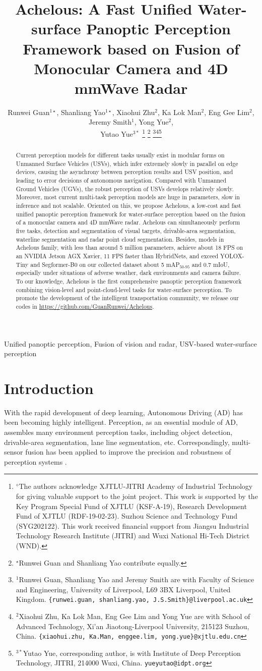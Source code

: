 \documentclass[letterpaper, 10 pt, conference]{ieeeconf}
\title{Achelous: A Fast Unified Water-surface Panoptic Perception Framework based on Fusion of Monocular Camera and 4D mmWave Radar}
\author{Runwei Guan$^{1\star}$, Shanliang Yao$^{1\star}$, Xiaohui Zhu$^{2}$, Ka Lok Man$^{2}$, Eng Gee Lim$^{2}$, Jeremy Smith$^{1}$,  Yong Yue$^{2}$, \\ Yutao Yue$^{3*}$
\thanks{$^{\diamond}$The authors acknowledge XJTLU-JITRI Academy of Industrial Technology for giving valuable support to the joint project. This work is supported by the Key Program Special Fund of XJTLU (KSF-A-19), Research Development Fund of XJTLU (RDF-19-02-23). Suzhou Science and Technology Fund (SYG202122). This work received financial support from Jiangsu Industrial Technology Research Institute (JITRI) and Wuxi National Hi-Tech District (WND).}
\thanks{$^{\star}$Runwei Guan and Shanliang Yao contribute equally.}
\thanks{$^{1}$Runwei Guan, Shanliang Yao and Jeremy Smith are with Faculty of Science and Engineering,
        University of Liverpool, L69 3BX Liverpool, United Kingdom. 
        {\tt\small \{runwei.guan, shanliang.yao, J.S.Smith\}@liverpool.ac.uk}}\thanks{$^{2}$Xiaohui Zhu, Ka Lok Man, Eng Gee Lim and Yong Yue are with School of Advanced Technology, Xi'an Jiaotong-Liverpool University, 215123 Suzhou, China.  
        {\tt\small \{xiaohui.zhu, Ka.Man, enggee.lim, yong.yue\}@xjtlu.edu.cn}}\thanks{$^{3*}$Yutao Yue, corresponding author, is with Institute of Deep Perception Technology, JITRI, 214000 Wuxi, China.  
        {\tt\small yueyutao@idpt.org}}}
\begin{document}
\maketitle
\thispagestyle{empty}
\pagestyle{empty}


\begin{abstract}
Current perception models for different tasks usually exist in modular forms on Unmanned Surface Vehicles (USVs), which infer extremely slowly in parallel on edge devices, causing the asynchrony between perception results and USV position, and leading to error decisions of autonomous navigation. Compared with Unmanned Ground Vehicles (UGVs), the robust perception of USVs develops relatively slowly. Moreover, most current multi-task perception models are huge in parameters, slow in inference and not scalable. Oriented on this, we propose Achelous, a low-cost and fast unified panoptic perception framework for water-surface perception based on the fusion of a monocular camera and 4D mmWave radar. Achelous can simultaneously perform five tasks, detection and segmentation of visual targets, drivable-area segmentation, waterline segmentation and radar point cloud segmentation. Besides, models in Achelous family, with less than around 5 million parameters, achieve about 18 FPS on an NVIDIA Jetson AGX Xavier, 11 FPS faster than HybridNets, and exceed YOLOX-Tiny and Segformer-B0 on our collected dataset about 5 mAP$_{\text{50-95}}$ and 0.7 mIoU, especially under situations of adverse weather, dark environments and camera failure. To our knowledge, Achelous is the first comprehensive panoptic perception framework combining vision-level and point-cloud-level tasks for water-surface perception. To promote the development of the intelligent transportation community, we release our codes in \url{https://github.com/GuanRunwei/Achelous}.
\end{abstract}

\begin{keywords}
Unified panoptic perception, Fusion of vision and radar, USV-based water-surface perception
\end{keywords}

\section{Introduction}

With the rapid development of deep learning, Autonomous Driving (AD) has been becoming highly intelligent. Perception, as an essential module of AD, assembles many environment perception tasks, including object detection, drivable-area segmentation, lane line segmentation, etc. Correspondingly, multi-sensor fusion has been applied to improve the precision and robustness of perception systems \cite{bai2022transfusion}.
\end{document}
